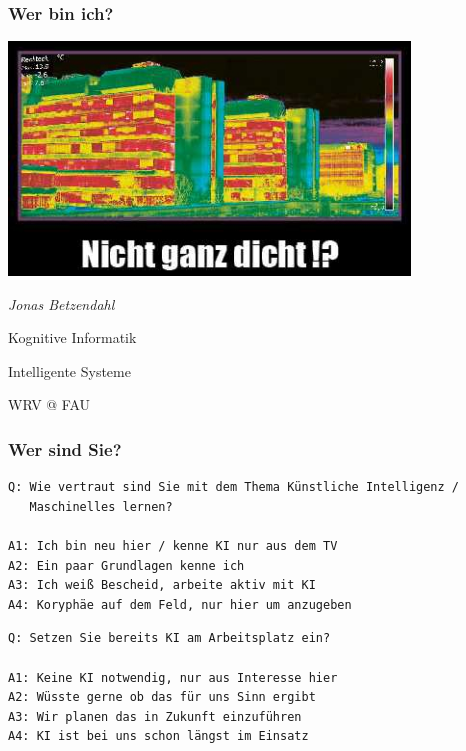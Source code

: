 \documentclass[aspectratio=169,xcolor=dvipsnames]{beamer}
\begin{document}
\begin{frame}
\frametitle{Wer bin ich?}
\begin{minipage}{0.6\paperwidth}
\begin{center}
\includegraphics[width=0.8\textwidth,keepaspectratio]{images/thermopostkarte}
\end{center}
\end{minipage}\begin{minipage}{0.25\paperwidth}
\Large
\emph{Jonas Betzendahl}
\normalsize
\bigskip

Kognitive Informatik

Intelligente Systeme
\medskip

WRV @ FAU 
\end{minipage}
\end{frame}

\begin{frame}[fragile]
\frametitle{Wer sind Sie?}
\scriptsize
\begin{minipage}{\textwidth}
\begin{verbatim}
Q: Wie vertraut sind Sie mit dem Thema Künstliche Intelligenz /
   Maschinelles lernen?

A1: Ich bin neu hier / kenne KI nur aus dem TV
A2: Ein paar Grundlagen kenne ich
A3: Ich weiß Bescheid, arbeite aktiv mit KI
A4: Koryphäe auf dem Feld, nur hier um anzugeben
\end{verbatim}
\end{minipage}
\pause \bigskip\bigskip

\begin{minipage}{\textwidth}
\begin{verbatim}
Q: Setzen Sie bereits KI am Arbeitsplatz ein?

A1: Keine KI notwendig, nur aus Interesse hier
A2: Wüsste gerne ob das für uns Sinn ergibt
A3: Wir planen das in Zukunft einzuführen
A4: KI ist bei uns schon längst im Einsatz
\end{verbatim}
\end{minipage}
\end{frame}
\end{document}
